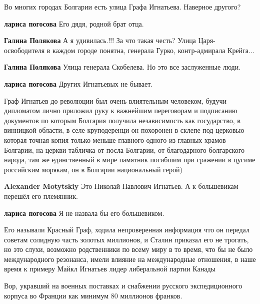 \begin{itemize}
Во многих городах Болгарии есть улица Графа Игнатьева.
Наверное другого?

\begin{itemize} %
\textbf{лариса погосова} Его дядя, родной брат отца.

\textbf{Галина Полякова}
А я удивилась.!!!
За что такая честь?
Улица Царя-освободителя в каждом городе понятна, генерала Гурко, контр-адмирала Крейга...

\textbf{Галина Полякова}
Улица генерала Скобелева.
Но это все заслуженные люди.

\textbf{лариса погосова} Других Игнатьевых не бывает.


Граф Игнатьев до революции был очень влиятельным человеком, будучи дипломатом
лично приложил руку к важнейшим переговорам и подписанию документов по которым
Болгария получила независимость как государство, в винницкой области, в селе
круподеренци он похоронен в склепе под церковью которая точная копия только
меньше главного одного из главных храмов Болгарии, на церкви табличка от посла
Болгарии, от благодарного болгарского народа, там же единственный в мире памятник
погибшим при сражении в цусиме российским морякам, он в Болгарии национальный
герой)

\begin{itemize} %
\textbf{Alexander Motytskiy}
Это Николай Павлович Игнатьев.
А к большевикам перешёл его племянник.

\textbf{лариса погосова} Я не назвала бы его большевиком.
\end{itemize} %


Его называли Красный Граф, ходила непроверенная информация что он передал
советам солидную часть золотых миллионов, и Сталин приказал его не трогать, но
это слухи, возможно родственники по всему миру в то время, что бы не было
международного резонанса, имели влияние на международные отношения, в наше время
к примеру Майкл Игнатьев лидер либеральной партии Канады

\end{itemize} %


Вор, укравший на военных поставках и снабжении русского экспедиционного корпуса
во Франции как минимум 80 миллионов франков.


\end{itemize}
